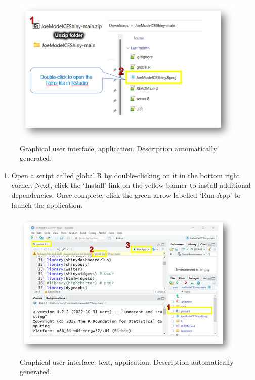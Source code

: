 \documentclass[
  letterpaper,
  DIV=11,
  numbers=noendperiod]{scrreprt}
\providecommand{\tightlist}{%
  \setlength{\itemsep}{0pt}\setlength{\parskip}{0pt}}\usepackage{longtable,booktabs,array}
\begin{document}
\begin{figure}

{\centering \includegraphics{images/image017.png}

}

\caption{Graphical user interface, application. Description
automatically generated.}

\end{figure}

\begin{enumerate}
\def\labelenumi{\arabic{enumi}.}
\setcounter{enumi}{2}
\tightlist
\item
  Open a script called global.R by double-clicking on it in the bottom
  right corner. Next, click the `Install' link on the yellow banner to
  install additional dependencies. Once complete, click the green arrow
  labelled `Run App' to launch the application.
\end{enumerate}

\begin{figure}

{\centering \includegraphics{images/image018.png}

}

\caption{Graphical user interface, text, application. Description
automatically generated.}

\end{figure}
\end{document}
